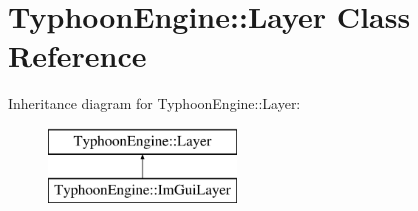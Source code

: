 \hypertarget{class_typhoon_engine_1_1_layer}{}\section{Typhoon\+Engine\+::Layer Class Reference}
\label{class_typhoon_engine_1_1_layer}
Inheritance diagram for Typhoon\+Engine\+::Layer\+:\begin{figure}[H]
\begin{center}
\leavevmode
\includegraphics[height=2.000000cm]{class_typhoon_engine_1_1_layer}
\end{center}
\end{figure}
